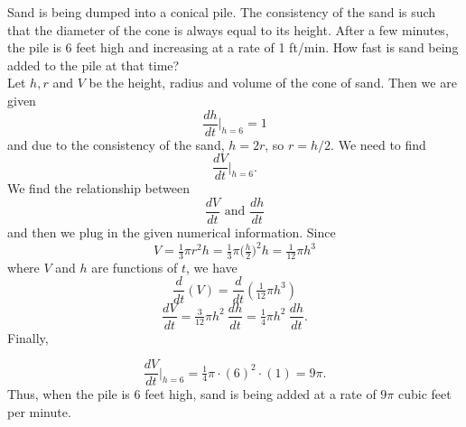 \documentclass{ximera}
\begin{document}
\begin{example}
Sand is being dumped into a conical pile. The consistency of the sand is such that the 
diameter of the cone is always equal to its height. After a few minutes,  the pile is 6 feet high and
increasing at a rate of 1 ft/min. How fast is sand being added to the pile at that time?\\

Let $h, r$ and $V$ be the height, radius and volume of the cone of sand. Then we are given
\[\frac{dh}{dt}\bigg|_{h = 6} = 1\]
and due to the consistency of the sand, $h = 2r$, so $r = h/2$.
We need to find 
\[\frac{dV}{dt}\bigg|_{h = 6}.\]
We find the relationship between 
\[\frac{dV}{dt} \text{ and } \frac{dh}{dt}\]
and then we plug in the given numerical information.
Since 
\[V = \tfrac13 \pi r^2 h = \tfrac13 \pi \big(\tfrac{h}{2}\big)^2 h = \tfrac{1}{12}\pi h^3\]
where $V$ and $h$ are functions of $t$, we have
\[\frac{d}{dt}(V) = \frac{d}{dt}(\tfrac{1}{12}\pi h^3)\]
\[\frac{dV}{dt} = \tfrac{3}{12}\pi h^2 \  \frac{dh}{dt} = \tfrac{1}{4}\pi h^2 \ \frac{dh}{dt}.\]
Finally,

\[\frac{dV}{dt}\bigg|_{h = 6} = \tfrac{1}{4}\pi \cdot (6)^2 \cdot(1) = 9\pi.\]
Thus, when the pile is 6 feet high, sand is being added at a rate of $9\pi$ cubic feet per minute.
\end{example}


\begin{center}
\begin{foldable}
\end{foldable}
\end{center}
\end{document}
